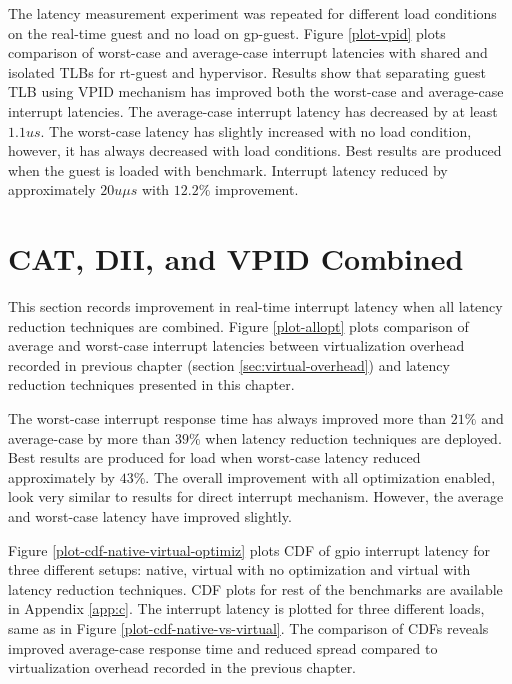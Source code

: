 

The latency measurement experiment was repeated for different load conditions on the real-time guest and no load on gp-guest. 
Figure \ref{plot-vpid} plots comparison of worst-case and average-case interrupt latencies with shared and isolated TLBs for rt-guest and hypervisor. 
Results show that separating guest TLB using VPID mechanism has improved both the worst-case and average-case interrupt latencies.
The average-case interrupt latency has decreased by at least $1.1us$. The worst-case latency has slightly increased with no load condition,
however, it has always decreased with load conditions. 
Best results are produced when the guest is loaded with \mthreadops{} benchmark. 
Interrupt latency reduced by approximately $20u\mu{}s$ with $12.2\%$ improvement.

\section{CAT, DII, and VPID Combined}
This section records improvement in real-time interrupt latency when all latency reduction techniques are combined.
Figure \ref{plot-allopt} plots comparison of average and worst-case interrupt latencies between virtualization 
overhead recorded in previous chapter (section \ref{sec:virtual-overhead}) and latency reduction techniques presented in this chapter.


The worst-case interrupt response time has always improved more than $21\%$ and average-case by more than $39\%$ when latency reduction techniques are deployed.
Best results are produced for \mthreadops{} load when worst-case latency reduced approximately by $43\%$.
The overall improvement with all optimization enabled, look very similar to results for direct interrupt mechanism. 
However, the average and worst-case latency have improved slightly.

Figure \ref{plot-cdf-native-virtual-optimiz} plots CDF of gpio interrupt latency for three different setups: native, virtual with no optimization and virtual with latency reduction techniques. 
CDF plots for rest of the benchmarks are available in Appendix \ref{app:c}.
The interrupt latency is plotted for three different loads, same as in Figure \ref{plot-cdf-native-vs-virtual}.
The comparison of CDFs reveals improved average-case response time and reduced spread compared to virtualization overhead recorded in the previous chapter.






